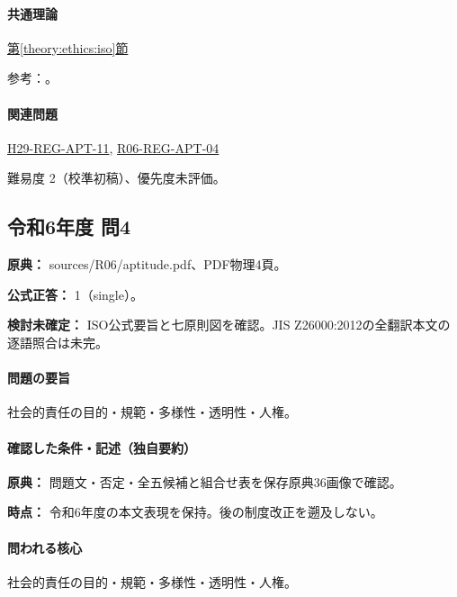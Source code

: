 \paragraph{共通理論} \hyperref[theory:ethics:iso]{第\ref*{theory:ethics:iso}節}

\par 参考：\cite{eth54_iso_brochure}。

\paragraph{関連問題} \hyperref[q:h29-reg-apt-11]{H29-REG-APT-11}, \hyperref[q:r06-reg-apt-04]{R06-REG-APT-04}

\par 難易度 2（校準初稿）、優先度未評価。

\subsection{令和6年度 問4}
\label{q:r06-reg-apt-04}

\noindent\textbf{原典：} sources/R06/aptitude.pdf、PDF物理4頁。

\textbf{公式正答：} 1（single）。

\par\textbf{検討未確定：} ISO公式要旨と七原則図を確認。JIS Z26000:2012の全翻訳本文の逐語照合は未完。

\paragraph{問題の要旨} 社会的責任の目的・規範・多様性・透明性・人権。

\paragraph{確認した条件・記述（独自要約）}\mbox{}\par

\noindent\textbf{原典：} 問題文・否定・全五候補と組合せ表を保存原典36画像で確認。\par

\noindent\textbf{時点：} 令和6年度の本文表現を保持。後の制度改正を遡及しない。\par

\paragraph{問われる核心} 社会的責任の目的・規範・多様性・透明性・人権。

